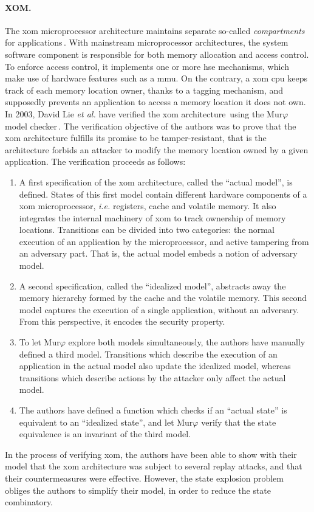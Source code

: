 \paragraph{XOM.}
%
The \ac{xom} microprocessor architecture maintains separate so-called
\emph{compartments} for applications\,\cite{lie2000architectural}.
%
With mainstream microprocessor architectures, the system software component is
responsible for both memory allocation and access control.
%
To enforce access control, it implements one or more \ac{hse} mechanisms, which
make use of hardware features such as a \ac{mmu}.
%
On the contrary, a \ac{xom} \ac{cpu} keeps track of each memory location owner,
thanks to a tagging mechanism, and supposedly prevents an application to access
a memory location it does not own.
%
In 2003, David Lie \emph{et al.} have verified the \ac{xom}
architecture\,\cite{lie2003xom} using the Mur$\varphi$ model
checker\,\cite{murphi}.
%
The verification objective of the authors was to prove that the \ac{xom}
architecture fulfills its promise to be tamper-resistant, that is the
architecture forbids an attacker to modify the memory location owned by a given
application.
%
The verification proceeds as follows:
%
\begin{enumerate}
\item A first specification of the \ac{xom} architecture, called the ``actual
  model'', is defined.
  States of this first model contain different hardware components of a \ac{xom}
  microprocessor, \emph{i.e.} registers, cache and volatile memory.
  It also integrates the internal machinery of \ac{xom} to track ownership of
  memory locations.
  Transitions can be divided into two categories: the normal execution of an
  application by the microprocessor, and active tampering from an adversary
  part.
  That is, the actual model embeds a notion of adversary model.
\item A second specification, called the ``idealized model'', abstracts away the
  memory hierarchy formed by the cache and the volatile memory.
  This second model captures the execution of a single application, without an
  adversary.
  From this perspective, it encodes the security property.
\item To let Mur\( \varphi \) explore both models simultaneously, the authors
  have manually defined a third model.
  Transitions which describe the execution of an application in the actual model
  also update the idealized model, whereas transitions which describe actions by
  the attacker only affect the actual model.
\item The authors have defined a function which checks if an ``actual state'' is
  equivalent to an ``idealized state'', and let Mur\( \varphi \) verify that the
  state equivalence is an invariant of the third model.
\end{enumerate}
%
In the process of verifying \ac{xom}, the authors have been able to show with
their model that the \ac{xom} architecture was subject to several replay
attacks, and that their countermeasures were effective.
%
However, the state explosion problem obliges the authors to simplify their
model, in order to reduce the state combinatory.

